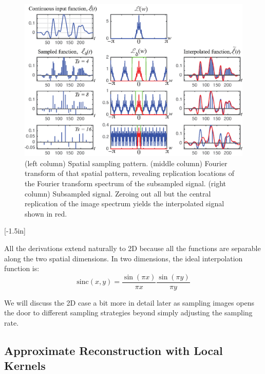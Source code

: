 \begin{figure}
\includegraphics[width=1\linewidth]{figures/Image_processing_sampling/sampling_FT4.eps}
\caption{(left column)  Spatial sampling
  pattern.  (middle column)  Fourier transform of that spatial pattern,
  revealing replication locations of the Fourier
  transform spectrum of the subsampled signal.  (right column) Subsampled signal.  Zeroing out all but the central
  replication of the image spectrum yields the
  interpolated signal shown in red.
} 
\label{fig:alias1d}
\end{figure}

[-1.5in]


All the derivations extend naturally to 2D because all the functions are separable along the two spatial dimensions. In two dimensions, the ideal interpolation function is:
\begin{equation}
\text{sinc} (x,y)  = \frac{\sin (\pi x)}{\pi x} \frac{\sin (\pi y)}{\pi y}
\end{equation}

We will discuss the 2D case a bit more in detail later as sampling images opens the door to different sampling strategies beyond simply adjusting the sampling rate.   

\subsection{Approximate Reconstruction with Local Kernels}

